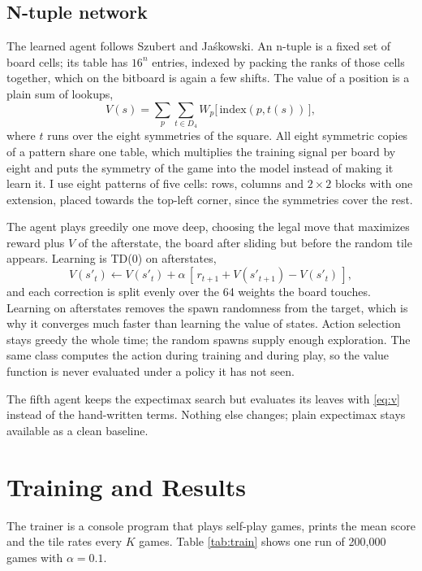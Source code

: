 \documentclass[conference]{IEEEtran}
\begin{document}
\subsection{N-tuple network}
The learned agent follows Szubert and Jaśkowski\cite{b1}. An n-tuple is a fixed set of board cells; its table has $16^{n}$ entries, indexed by packing the ranks of those cells together, which on the bitboard is again a few shifts. The value of a position is a plain sum of lookups,
\begin{equation}
V(s)=\sum_{p}\sum_{t\in D_4} W_p\big[\,\mathrm{index}(p, t(s))\,\big],\label{eq:v}
\end{equation}
where $t$ runs over the eight symmetries of the square. All eight symmetric copies of a pattern share one table, which multiplies the training signal per board by eight and puts the symmetry of the game into the model instead of making it learn it. I use eight patterns of five cells: rows, columns and $2\times2$ blocks with one extension, placed towards the top-left corner, since the symmetries cover the rest. 

The agent plays greedily one move deep, choosing the legal move that maximizes reward plus $V$ of the afterstate, the board after sliding but before the random tile appears. Learning is TD(0)\cite{b5} on afterstates,
\begin{equation}
V(s'_t)\leftarrow V(s'_t)+\alpha\,[\,r_{t+1}+V(s'_{t+1})-V(s'_t)\,],\label{eq:td}
\end{equation}
and each correction is split evenly over the 64 weights the board touches. Learning on afterstates removes the spawn randomness from the target, which is why it converges much faster than learning the value of states. Action selection stays greedy the whole time; the random spawns supply enough exploration. The same class computes the action during training and during play, so the value function is never evaluated under a policy it has not seen.

The fifth agent keeps the expectimax search but evaluates its leaves with \eqref{eq:v} instead of the hand-written terms. Nothing else changes; plain expectimax stays available as a clean baseline.

\section{Training and Results}
The trainer is a console program that plays self-play games, prints the mean score and the tile rates every $K$ games. Table \ref{tab:train} shows one run of 200{,}000 games with $\alpha=0.1$.
\end{document}
